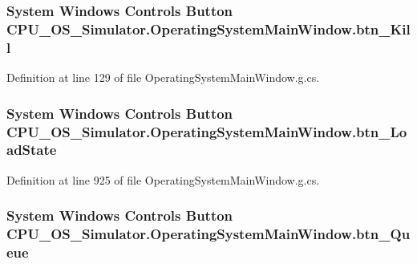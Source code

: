 \subsubsection[{btn\+\_\+\+Kill}]{\setlength{\rightskip}{0pt plus 5cm}System Windows Controls Button C\+P\+U\+\_\+\+O\+S\+\_\+\+Simulator.\+Operating\+System\+Main\+Window.\+btn\+\_\+\+Kill\hspace{0.3cm}{\ttfamily [package]}}\label{class_c_p_u___o_s___simulator_1_1_operating_system_main_window_a2620163d6bdb8e06f63a7b8027628bc3}


Definition at line 129 of file Operating\+System\+Main\+Window.\+g.\+cs.

\hypertarget{class_c_p_u___o_s___simulator_1_1_operating_system_main_window_ada2a0a3adb1f88558207fdd5b5dbea30}{}
\subsubsection[{btn\+\_\+\+Load\+State}]{\setlength{\rightskip}{0pt plus 5cm}System Windows Controls Button C\+P\+U\+\_\+\+O\+S\+\_\+\+Simulator.\+Operating\+System\+Main\+Window.\+btn\+\_\+\+Load\+State\hspace{0.3cm}{\ttfamily [package]}}\label{class_c_p_u___o_s___simulator_1_1_operating_system_main_window_ada2a0a3adb1f88558207fdd5b5dbea30}


Definition at line 925 of file Operating\+System\+Main\+Window.\+g.\+cs.

\hypertarget{class_c_p_u___o_s___simulator_1_1_operating_system_main_window_a241f1be0b04ce501c83e182629a6c694}{}
\subsubsection[{btn\+\_\+\+Queue}]{\setlength{\rightskip}{0pt plus 5cm}System Windows Controls Button C\+P\+U\+\_\+\+O\+S\+\_\+\+Simulator.\+Operating\+System\+Main\+Window.\+btn\+\_\+\+Queue\hspace{0.3cm}{\ttfamily [package]}}\label{class_c_p_u___o_s___simulator_1_1_operating_system_main_window_a241f1be0b04ce501c83e182629a6c694}


